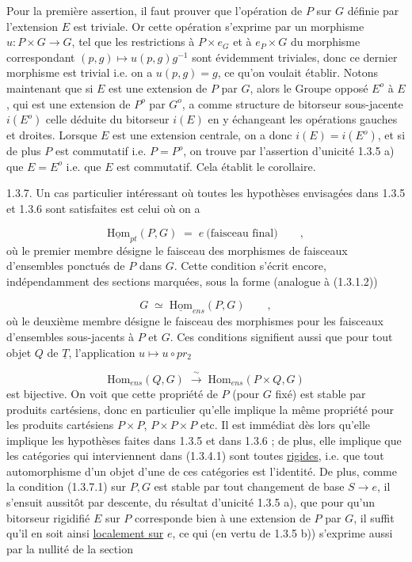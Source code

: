 Pour la première assertion, il faut prouver que l'opération de $P$ sur $G$ définie par l'extension $E$ est triviale. Or cette opération s'exprime par un morphisme $u : P\times G \longrightarrow G$, tel que les restrictions à $P\times e_G$ et à $e_P\times G$ du morphisme correspondant $(p,g) \longmapsto u(p,g)g^{-1}$ sont évidemment triviales, donc ce dernier morphisme est trivial i.e. on a $u(p,g) = g$, ce qu'on voulait établir. Notons maintenant que si $E$ est une extension de $P$ par $G$, alors le Groupe opposé $E^o$ à $E$, qui est une extension de $P^o$ par $G^o$, a comme structure de bitorseur sous-jacente $i(E^o)$ celle déduite du bitorseur $i(E)$ en y échangeant les opérations gauches et droites. Lorsque $E$ est une extension centrale, on a donc $i(E)=i(E^o)$, et si de plus $P$ est commutatif i.e. $P=P^o$, on trouve par l'assertion d'unicité 1.3.5 a) que $E=E^o$ i.e. que $E$ est commutatif. Cela établit le corollaire.



1.3.7. Un cas particulier intéressant où toutes les hypothèses envisagées dans 1.3.5 et 1.3.6 sont satisfaites est celui où on a

\begin{equation}\tag{1.3.7.1}
\underline{\mathrm{Hom}}_{pt}(P,G) \;=\; e \ \text{(faisceau final)} \qquad ,
\end{equation}
où le premier membre désigne le faisceau des morphismes de faisceaux d'ensembles ponctués de $P$ dans $G$. Cette condition s'écrit encore, indépendamment des sections marquées, sous la forme (analogue à (1.3.1.2))

\begin{equation}\tag{1.3.7.2}
G \;\simeq\; \underline{\mathrm{Hom}}_{ens}(P,G) \qquad ,
\end{equation}
où le deuxième membre désigne le faisceau des morphismes pour les faisceaux d'ensembles sous-jacents à $P$ et $G$. Ces conditions signifient aussi que pour tout objet $Q$ de $\underline{T}$, l'application $u \longmapsto u\circ pr_2$

\begin{equation}\tag{1.3.7.3}
\mathrm{Hom}_{ens}(Q,G) \;\xrightarrow{\ \sim\ }\; \mathrm{Hom}_{ens}(P\times Q,G)
\end{equation}
est bijective. On voit que cette propriété de $P$ (pour $G$ fixé) est stable par produits cartésiens, donc en particulier qu'elle implique la même propriété pour les produits cartésiens $P\times P$, $P\times P\times P$ etc. Il est immédiat dès lors qu'elle implique les hypothèses faites dans 1.3.5 et dans 1.3.6 ; de plus, elle implique que les catégories qui interviennent dans (1.3.4.1) sont toutes \underline{rigides}, i.e. que tout automorphisme d'un objet d'une de ces catégories est l'identité. De plus, comme la condition (1.3.7.1) sur $P,G$ est stable par tout changement de base $S \longrightarrow e$, il s'ensuit aussitôt par descente, du résultat d'unicité 1.3.5 a), que pour qu'un bitorseur rigidifié $E$ sur $P$ corresponde bien à une extension de $P$ par $G$, il suffit qu'il en soit ainsi \underline{localement sur} $e$, ce qui (en vertu de 1.3.5 b)) s'exprime aussi par la nullité de la section

